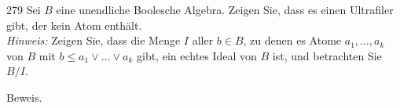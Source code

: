 \begin{algebraUE}{279}
Sei $B$ eine unendliche Boolesche Algebra. Zeigen Sie, dass es einen Ultrafiler gibt,
der kein Atom enthält. \\
\textit{Hinweis:} Zeigen Sie, dass die Menge $I$ aller $b \in B$, zu denen es
Atome $a_1,\dots,a_k$ von $B$ mit $b \leq a_1 \lor \dots \lor a_k$ gibt,
ein echtes Ideal von $B$ ist, und betrachten Sie $B/I$.
\end{algebraUE}
\begin{solution}
Beweis.
\end{solution}

